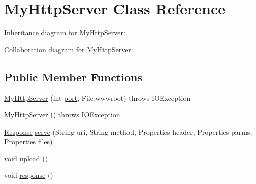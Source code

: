 \hypertarget{classcom_1_1axcoto_1_1shinjuku_1_1maki_1_1_my_http_server}{\section{\-My\-Http\-Server \-Class \-Reference}
\label{classcom_1_1axcoto_1_1shinjuku_1_1maki_1_1_my_http_server}
}


\-Inheritance diagram for \-My\-Http\-Server\-:


\-Collaboration diagram for \-My\-Http\-Server\-:
\subsection*{\-Public \-Member \-Functions}
\begin{DoxyCompactItemize}
\item 
\hyperlink{classcom_1_1axcoto_1_1shinjuku_1_1maki_1_1_my_http_server_af7748d2ba2839af10fae4afa68f478e8}{\-My\-Http\-Server} (int \hyperlink{classcom_1_1axcoto_1_1shinjuku_1_1maki_1_1_my_http_server_a63c89c04d1feae07ca35558055155ffb}{port}, \-File wwwroot)  throws I\-O\-Exception 
\item 
\hyperlink{classcom_1_1axcoto_1_1shinjuku_1_1maki_1_1_my_http_server_a9bb54a029af47e791dc5765757b0a1b0}{\-My\-Http\-Server} ()  throws I\-O\-Exception 
\item 
\hyperlink{classcom_1_1axcoto_1_1shinjuku_1_1maki_1_1_nano_h_t_t_p_d_1_1_response}{\-Response} \hyperlink{classcom_1_1axcoto_1_1shinjuku_1_1maki_1_1_my_http_server_a0ef7299275c6b9aae10e13fdbe9df1da}{serve} (\-String uri, \-String method, \-Properties header, \-Properties parms, \-Properties files)
\item 
void \hyperlink{classcom_1_1axcoto_1_1shinjuku_1_1maki_1_1_my_http_server_af94458b1e155a86f91f1bed04b16bca3}{upload} ()
\item 
void \hyperlink{classcom_1_1axcoto_1_1shinjuku_1_1maki_1_1_my_http_server_ae3aed844a4bbfb69d20ebe835f9f94f8}{response} ()
\end{DoxyCompactItemize}
